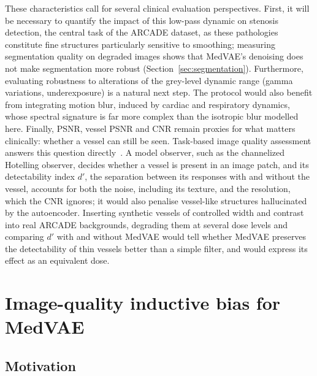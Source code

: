 \documentclass[conference]{IEEEtran}
\begin{document}
These characteristics call for several clinical evaluation perspectives.
First, it will be necessary to quantify the impact of this low-pass
dynamic on stenosis detection, the central task of the ARCADE dataset,
as these pathologies constitute fine structures particularly sensitive
to smoothing; measuring segmentation quality on degraded images
shows that MedVAE's denoising does not make segmentation more robust
(Section~\ref{sec:segmentation}).
Furthermore, evaluating robustness to alterations of the grey-level
dynamic range (gamma variations, underexposure) is a natural next step.
The protocol would also benefit from integrating motion blur,
induced by cardiac and respiratory dynamics, whose spectral signature is
far more complex than the isotropic blur modelled here.
Finally, PSNR, vessel PSNR and CNR remain proxies for what matters
clinically: whether a vessel can still be seen. Task-based image quality
assessment answers this question directly~\cite{barrett2004foundations}.
A model observer, such as the channelized Hotelling observer, decides
whether a vessel is present in an image patch, and its detectability
index $d'$, the separation between its responses with and without the
vessel, accounts for both the noise, including its texture, and the
resolution, which the CNR ignores; it would also penalise vessel-like
structures hallucinated by the autoencoder. Inserting synthetic vessels
of controlled width and contrast into real ARCADE backgrounds, degrading
them at several dose levels and comparing $d'$ with and without MedVAE
would tell whether MedVAE preserves the detectability of thin vessels
better than a simple filter, and would express its effect as an
equivalent dose.

\newpage
\section{Image-quality inductive bias for MedVAE}
\label{sec:theophile}

\subsection{Motivation}
\end{document}
